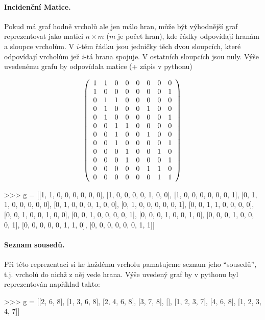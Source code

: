 \paragraph{Incidenční Matice.} Pokud má graf hodně vrcholů ale jen málo hran, může být výhodnější graf reprezentovat jako matici $n\times m$ ($m$ je počet hran), kde řádky
odpovídají hranám a sloupce vrcholům. V $i$-tém řádku jsou jedničky těch dvou sloupcích, které odpovídají vrcholům jež $i$-tá hrana spojuje. V ostatních sloupcích jsou nuly.
Výše uvedenému grafu by odpovídala matice (+ zápis v pythonu)
\begin{center}
\begin{minipage}{3.5cm}
$$
\left(
\begin{array}{cccccccc}
1 & 1 & 0 & 0 & 0 & 0 & 0 & 0\cr
1 & 0 & 0 & 0 & 0 & 0 & 0 & 1\cr
0 & 1 & 1 & 0 & 0 & 0 & 0 & 0\cr
0 & 1 & 0 & 0 & 0 & 1 & 0 & 0\cr
0 & 1 & 0 & 0 & 0 & 0 & 0 & 1\cr
0 & 0 & 1 & 1 & 0 & 0 & 0 & 0\cr
0 & 0 & 1 & 0 & 0 & 1 & 0 & 0\cr
0 & 0 & 1 & 0 & 0 & 0 & 0 & 1\cr
0 & 0 & 0 & 1 & 0 & 0 & 1 & 0\cr
0 & 0 & 0 & 1 & 0 & 0 & 0 & 1\cr
0 & 0 & 0 & 0 & 0 & 1 & 1 & 0\cr
0 & 0 & 0 & 0 & 0 & 0 & 1 & 1\cr
\end{array}
\right)
$$
\end{minipage}
\hskip2cm
\begin{minipage}{7cm}
\begin{python}
>>> g = [[1, 1, 0, 0, 0, 0, 0, 0],
	 [1, 0, 0, 0, 0, 1, 0, 0],
	 [1, 0, 0, 0, 0, 0, 0, 1],
	 [0, 1, 1, 0, 0, 0, 0, 0],
	 [0, 1, 0, 0, 0, 1, 0, 0],
	 [0, 1, 0, 0, 0, 0, 0, 1],
	 [0, 0, 1, 1, 0, 0, 0, 0],
	 [0, 0, 1, 0, 0, 1, 0, 0],
	 [0, 0, 1, 0, 0, 0, 0, 1],
	 [0, 0, 0, 1, 0, 0, 1, 0],
	 [0, 0, 0, 1, 0, 0, 0, 1],
	 [0, 0, 0, 0, 0, 1, 1, 0],
	 [0, 0, 0, 0, 0, 0, 1, 1]]
\end{python}
\end{minipage}
\end{center}

\paragraph{Seznam sousedů.} Při této reprezentaci si ke každému vrcholu pamatujeme seznam jeho ``sousedů'', t.j. vrcholů do nichž z něj vede hrana.
Výše uvedený graf by v pythonu byl reprezentován například takto:

{
\begin{python}
 >>> g = [[2, 6, 8],
	  [1, 3, 6, 8],
	  [2, 4, 6, 8],
	  [3, 7, 8],
	  [],
	  [1, 2, 3, 7],
	  [4, 6, 8],
	  [1, 2, 3, 4, 7]]
\end{python}
}

